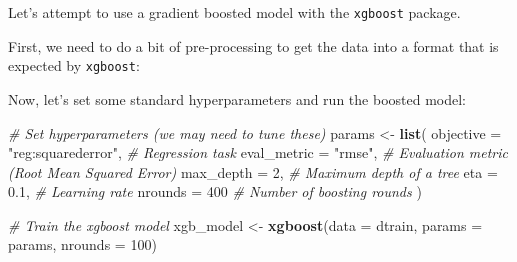 \documentclass[
]{article}
\newenvironment{Shaded}{\begin{snugshade}}{\end{snugshade}}
\newcommand{\AttributeTok}[1]{\textcolor[rgb]{0.13,0.29,0.53}{#1}}
\newcommand{\CommentTok}[1]{\textcolor[rgb]{0.56,0.35,0.01}{\textit{#1}}}
\newcommand{\DecValTok}[1]{\textcolor[rgb]{0.00,0.00,0.81}{#1}}
\newcommand{\FloatTok}[1]{\textcolor[rgb]{0.00,0.00,0.81}{#1}}
\newcommand{\FunctionTok}[1]{\textcolor[rgb]{0.13,0.29,0.53}{\textbf{#1}}}
\newcommand{\NormalTok}[1]{#1}
\newcommand{\OtherTok}[1]{\textcolor[rgb]{0.56,0.35,0.01}{#1}}
\newcommand{\SpecialCharTok}[1]{\textcolor[rgb]{0.81,0.36,0.00}{\textbf{#1}}}
\newcommand{\StringTok}[1]{\textcolor[rgb]{0.31,0.60,0.02}{#1}}
\begin{document}
Let's attempt to use a gradient boosted model with the \texttt{xgboost}
package.

First, we need to do a bit of pre-processing to get the data into a
format that is expected by \texttt{xgboost}:

\begin{Shaded}
\end{Shaded}

Now, let's set some standard hyperparameters and run the boosted model:

\begin{Shaded}
\begin{Highlighting}[]
\CommentTok{\# Set hyperparameters (we may need to tune these)}
\NormalTok{params }\OtherTok{\textless{}{-}} \FunctionTok{list}\NormalTok{(}
  \AttributeTok{objective =} \StringTok{"reg:squarederror"}\NormalTok{,  }\CommentTok{\# Regression task}
  \AttributeTok{eval\_metric =} \StringTok{"rmse"}\NormalTok{,            }\CommentTok{\# Evaluation metric (Root Mean Squared Error)}
  \AttributeTok{max\_depth =} \DecValTok{2}\NormalTok{,                 }\CommentTok{\# Maximum depth of a tree}
  \AttributeTok{eta =} \FloatTok{0.1}\NormalTok{,               }\CommentTok{\# Learning rate}
  \AttributeTok{nrounds =} \DecValTok{400}     \CommentTok{\# Number of boosting rounds}
\NormalTok{)}

\CommentTok{\# Train the xgboost model}
\NormalTok{xgb\_model }\OtherTok{\textless{}{-}} \FunctionTok{xgboost}\NormalTok{(}\AttributeTok{data =}\NormalTok{ dtrain, }\AttributeTok{params =}\NormalTok{ params, }\AttributeTok{nrounds =} \DecValTok{100}\NormalTok{)}
\end{Highlighting}
\end{Shaded}
\end{document}
